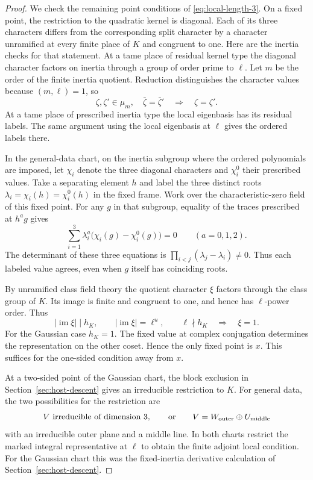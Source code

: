 \begin{proof}
We check the remaining point conditions of \eqref{eq:local-length-3}.
On a fixed point, the restriction to the
quadratic kernel is diagonal. Each of its
three characters differs from the corresponding
split character by a character unramified at
every finite place of \(K\) and congruent
to one. Here are the inertia checks for
that statement. At a tame place of residual
kernel type the diagonal character factors
on inertia through a group of order prime
to \(\ell\). Let \(m\) be the order of the finite inertia quotient. Reduction distinguishes the character values because \((m,\ell)=1\), so
\[
 \zeta,\zeta'\in\mu_m,\quad\bar\zeta=\bar\zeta'\quad\Longrightarrow\quad\zeta=\zeta'.
\] At a tame place of prescribed
inertia type the local eigenbasis has its
residual labels. The same argument using
the local eigenbasis at \(\ell\) gives the
ordered labels there.

In the general-data chart, on the inertia subgroup where the ordered polynomials are imposed, let \(\chi_i\) denote the three diagonal characters and \(\chi_i^0\) their prescribed values. Take a separating element \(h\) and label the three distinct roots \(\lambda_i=\chi_i(h)=\chi_i^0(h)\) in the fixed frame. Work over the characteristic-zero field of this fixed point. For any \(g\) in that subgroup, equality of the traces prescribed at \(h^a g\) gives
\[
 \sum_{i=1}^3 \lambda_i^a\bigl(\chi_i(g)-\chi_i^0(g)\bigr)=0
              \qquad (a=0,1,2).
\]
The determinant of these three equations is \(\prod_{i<j}(\lambda_j-\lambda_i)\ne0\). Thus each labeled value agrees, even when \(g\) itself has coinciding roots.

By unramified class field theory the quotient character \(\xi\)
factors through the class group of \(K\). Its image is finite and
congruent to one, and hence has \(\ell\)-power order. Thus
\[
 |\operatorname{im}\xi|\mid h_K,\qquad
 |\operatorname{im}\xi|=\ell^u,\qquad \ell\nmid h_K
 \quad\Longrightarrow\quad \xi=1.
\] For the Gaussian
case \(h_K=1\). The fixed value at complex
conjugation determines the representation
on the other coset. Hence the only
fixed point is \(x\). This suffices for
the one-sided condition away from \(x\).

At a two-sided point of the Gaussian chart,
the block exclusion in Section~\ref{sec:host-descent}
gives an irreducible restriction to \(K\).
For general data, the two possibilities for the restriction are
\[
 V\text{ irreducible of dimension }3,\qquad\text{or}\qquad V=W_{\rm outer}\oplus U_{\rm middle}
\]
with an irreducible outer plane and a middle line. In both charts
restrict the marked integral representative
at \(\ell\) to obtain the finite adjoint
local condition. For the Gaussian chart
this was the fixed-inertia derivative
calculation of Section~\ref{sec:host-descent}.


\end{proof}

